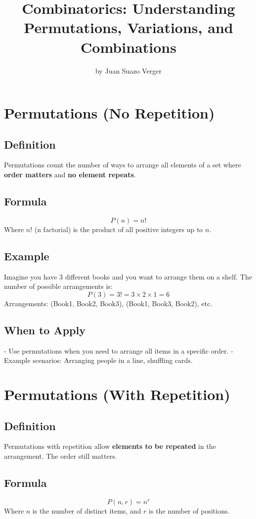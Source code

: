\documentclass{article}
\title{Combinatorics: Understanding Permutations, Variations, and Combinations}
\author{by Juan Suazo Verger}
\date{}
\begin{document}
\maketitle

\newpage
\section{Permutations (No Repetition)}

\subsection{Definition}
Permutations count the number of ways to arrange all elements of a set where \textbf{order matters} and \textbf{no element repeats}.

\subsection{Formula}
\[
P(n) = n!
\]
Where \(n\)! (n factorial) is the product of all positive integers up to \(n\).

\subsection{Example}
Imagine you have 3 different books and you want to arrange them on a shelf. The number of possible arrangements is:
\[
P(3) = 3! = 3 \times 2 \times 1 = 6
\]
Arrangements: (Book1, Book2, Book3), (Book1, Book3, Book2), etc.

\subsection{When to Apply}
- Use permutations when you need to arrange all items in a specific order.
- Example scenarios: Arranging people in a line, shuffling cards.

\newpage
\section{Permutations (With Repetition)}

\subsection{Definition}
Permutations with repetition allow \textbf{elements to be repeated} in the arrangement. The order still matters.

\subsection{Formula}
\[
P(n, r) = n^r
\]
Where \(n\) is the number of distinct items, and \(r\) is the number of positions.
\end{document}
